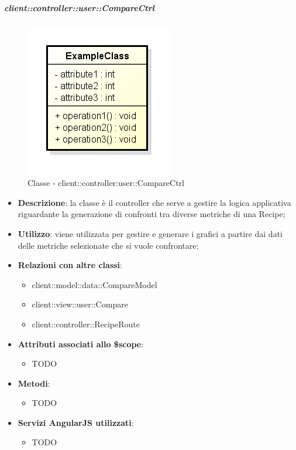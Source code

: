 		\subparagraph{client::controller::user::CompareCtrl} %
		\label{subp:client_controller_user_comparectrl}
			\begin{figure}[htbp]
				\centering
				\centerline{\includegraphics[scale=0.7]{./images/client/classes/example_class.png}}
				\caption{Classe - client::controller:user::CompareCtrl}
			\end{figure}
			\begin{itemize}
				\item \textbf{Descrizione}: la classe è il controller che serve a gestire la logica applicativa riguardante la generazione di confronti tra diverse metriche di una Recipe;
				\item \textbf{Utilizzo}: viene utilizzata per gestire e generare i grafici a partire dai dati delle metriche selezionate che si vuole confrontare;
				\item \textbf{Relazioni con altre classi}:
					\begin{itemize}
						\item client::model::data::CompareModel
						\item client::view::user::Compare
						\item client::controller::RecipeRoute
					\end{itemize}

				\item \textbf{Attributi associati allo \$scope}:
					\begin{itemize}
						\item TODO
					\end{itemize}

				\item \textbf{Metodi}:
					\begin{itemize}
						\item TODO
					\end{itemize}

				\item \textbf{Servizi AngularJS utilizzati}:
					\begin{itemize}
						\item TODO
					\end{itemize}

			\end{itemize}

